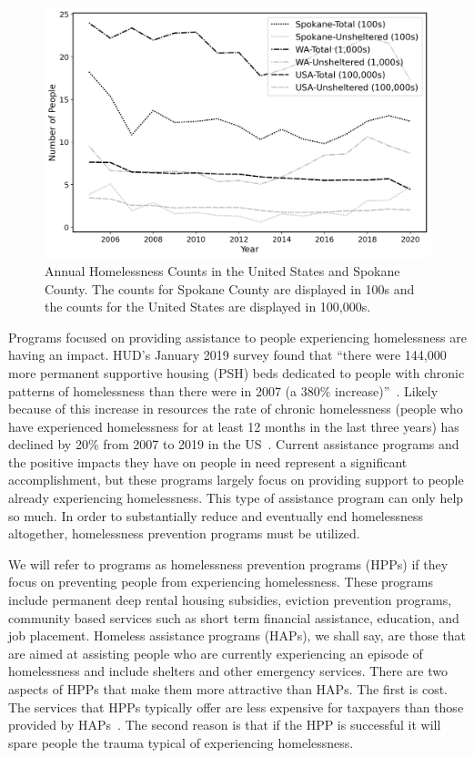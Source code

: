 \documentclass[10pt,letterpaper]{article}
\begin{document}
\fi

\begin{figure}[h]
    \includegraphics[width=\textwidth]{../img/homelessness_all.png}
    \caption[Annual Homelessness Counts in the USA and Spokane County]{Annual Homelessness Counts in the United States and Spokane County. The counts for Spokane County are displayed in 100s and the counts for the United States are displayed in 100,000s.~\cite{PITcount}}
    \label{fig:homelessness_counts}
\end{figure}

Programs focused on providing assistance to people experiencing homelessness are having an impact. HUD's January 2019 survey found that ``there were 144,000 more permanent supportive housing (PSH) beds dedicated to people with chronic patterns of homelessness than there were in 2007 (a 380\% increase)''~\cite{2019AHAR}. Likely because of this increase in resources the rate of chronic homelessness (people who have experienced homelessness for at least 12 months in the last three years) has declined by 20\% from 2007 to 2019 in the US~\cite{2019AHAR}. Current assistance programs and the positive impacts they have on people in need represent a significant accomplishment, but these programs largely focus on providing support to people already experiencing homelessness. This type of assistance program can only help so much. In order to substantially reduce and eventually end homelessness altogether, homelessness prevention programs must be utilized. 

We will refer to programs as homelessness prevention programs (HPPs) if they focus on preventing people from experiencing homelessness. These programs include permanent deep rental housing subsidies, eviction prevention programs, community based services such as short term financial assistance, education, and job placement. Homeless assistance programs (HAPs), we shall say, are those that are aimed at assisting people who are currently experiencing an episode of homelessness and include shelters and other emergency services. There are two aspects of HPPs that make them more attractive than HAPs. The first is cost. The services that HPPs typically offer are less expensive for taxpayers than those provided by HAPs~\cite{shinn2019homelessness}. The second reason is that if the HPP is successful it will spare people the trauma typical of experiencing homelessness.
\end{document}
